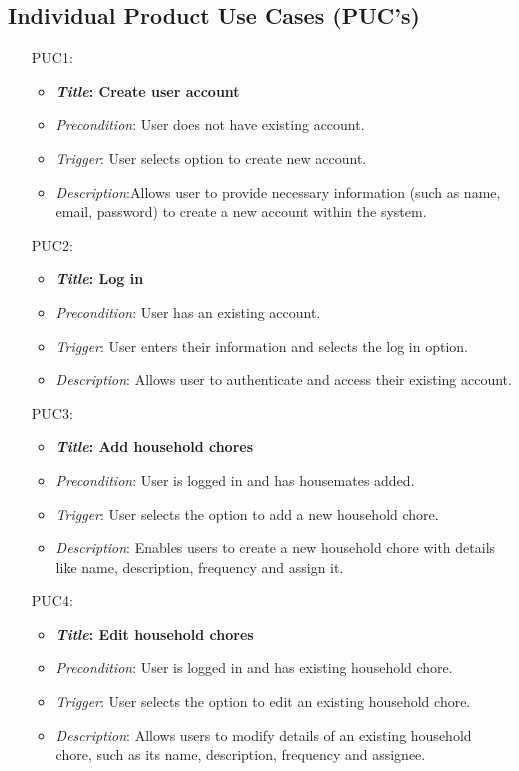 \documentclass[12pt]{article}
\begin{document}
\subsection{Individual Product Use Cases (PUC's)}
\begin{itemize}
    \item[PUC1:]
        \begin{itemize}
            \item \textbf{\textit{Title}: Create user account}
            \item \textit{Precondition}: User does not have existing account.
            \item \textit{Trigger}: User selects option to create new account.
            \item \textit{Description}:Allows user to provide necessary information (such as name, email, password) to create a new account within the system.
    \end{itemize}

    \item[PUC2:]
        \begin{itemize}
            \item \textbf{\textit{Title}: Log in}
            \item \textit{Precondition}: User has an existing account.
            \item \textit{Trigger}: User enters their information and selects the log in option.
            \item \textit{Description}: Allows user to authenticate and access their existing account.
    \end{itemize}

    \item[PUC3:]
        \begin{itemize}
            \item \textbf{\textit{Title}: Add household chores}
            \item \textit{Precondition}: User is logged in and has housemates added.
            \item \textit{Trigger}: User selects the option to add a new household chore.
            \item \textit{Description}: Enables users to create a new household chore with details like name, description, frequency and assign it.
    \end{itemize}

    \item[PUC4:]
        \begin{itemize}
            \item \textbf{\textit{Title}: Edit household chores}
            \item \textit{Precondition}: User is logged in and has existing household chore.
            \item \textit{Trigger}: User selects the option to edit an existing household chore.
            \item \textit{Description}: Allows users to modify details of an existing household chore, such as its name, description, frequency and assignee.
    \end{itemize}


\end{itemize}
\end{document}
